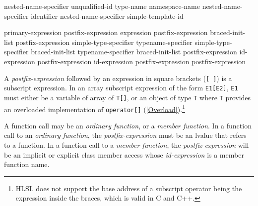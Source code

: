 
\begin{grammar}
  \br
  nested-name-specifier  unqualified-id\br
  \br
  \terminal{::}\br
  type-name \terminal{::}\br
  namespace-name \terminal{::}\br
  nested-name-specifier identifier \terminal{::}\br
  nested-name-specifier  simple-template-id \terminal{::}
\end{grammar}


\begin{grammar}
  \br
  primary-expression\br
  postfix-expression \terminal{[} expression \terminal{]}\br
  postfix-expression \terminal{[} braced-init-list \terminal{]}\br
  postfix-expression \terminal{(}  \terminal{)}\br
  simple-type-specifier \terminal{(}  \terminal{)}\br
  typename-specifier \terminal{(}  \terminal{)}\br
  simple-type-specifier braced-init-list\br
  typename-specifier braced-init-list\br
  postfix-expression   id-expression\br
  postfix-expression \terminal{->}  id-expression\br
  postfix-expression \terminal{++}\br
  postfix-expression \terminal{--}
\end{grammar}


\p A \textit{postfix-expression} followed by an expression in square brackets
(\texttt{[ ]}) is a subscript expression. In an array subscript expression of
the form \texttt{E1[E2]}, \texttt{E1} must either be a variable of array of
\texttt{T[]}, or an object of type \texttt{T} where \texttt{T} provides an
overloaded implementation of \texttt{operator[]} (\ref{Overload}).\footnote{HLSL
does not support the base address of a subscript operator being the expression
inside the braces, which is valid in C and C++.}


\p A function call may be an \textit{ordinary function}, or a \textit{member
function}. In a function call to an \textit{ordinary function}, the
\textit{postfix-expression} must be an lvalue that refers to a function. In a
function call to a \textit{member function}, the \textit{postfix-expression}
will be an implicit or explicit class member access whose \textit{id-expression}
is a member function name.

